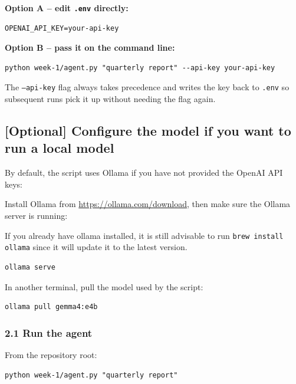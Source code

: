 \documentclass[12pt, a4paper]{article}
\begin{document}
\textbf{Option A -- edit \texttt{.env} directly:}

\begin{lstlisting}[style=plainstyle]
OPENAI_API_KEY=your-api-key
\end{lstlisting}

\textbf{Option B -- pass it on the command line:}

\begin{lstlisting}[style=shellstyle]
python week-1/agent.py "quarterly report" --api-key your-api-key
\end{lstlisting}

The \texttt{--api-key} flag always takes precedence and writes the key back to \texttt{.env} so subsequent runs pick it up without needing the flag again.

\subsection{[Optional] Configure the model if you want to run a local model}

By default, the script uses Ollama if you have not provided the OpenAI API keys:

Install Ollama from \url{https://ollama.com/download}, then make sure the Ollama server is running:

\begin{notebox}
    If you already have ollama installed, it is still advisable to run \texttt{brew install ollama} since it will update it to the latest version.
\end{notebox}

\begin{lstlisting}[style=shellstyle]
ollama serve
\end{lstlisting}

In another terminal, pull the model used by the script:

\begin{lstlisting}[style=shellstyle]
ollama pull gemma4:e4b
\end{lstlisting}


\subsubsection{2.1 Run the agent}

From the repository root:

\begin{lstlisting}[style=shellstyle]
python week-1/agent.py "quarterly report"
\end{lstlisting}
\end{document}
